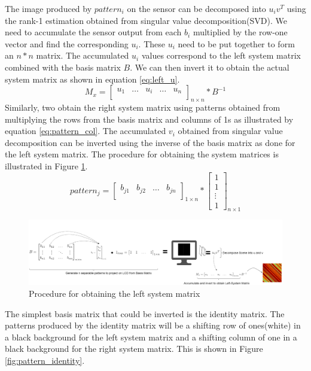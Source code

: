 The image produced by $pattern_i$ on the sensor can be decomposed into $u_iv^T$ using the rank-1 estimation obtained from singular value decomposition(SVD). We need to accumulate the sensor output from each $b_i$ multiplied by the row-one vector and find the corresponding $u_i$. These $u_i$ need to be put together to form an $n*n$ matrix. The accumulated $u_i$ values correspond to the left system matrix combined with the basis matrix $B$. We can then invert it to obtain the actual system matrix as shown in equation \ref{eq:left_u}.
\begin{equation}
M_x = \begin{bmatrix} 
    u_{1} & \dots & u_i &  \dots & u_n \\
  
    \end{bmatrix}_{n\times n} * B^{-1}
    \label{eq:left_u}
\end{equation}
Similarly, two obtain the right system matrix using patterns obtained from multiplying the rows from the basis matrix and columns of 1s as illustrated by equation \ref{eq:pattern_col}. The accumulated $v_i$ obtained from singular value decomposition can be inverted using the inverse of the basis matrix as done for the left system matrix. The procedure for obtaining the system matrices is illustrated in Figure \ref{fig:sys_est}.
\begin{equation}
pattern_{j} = \begin{bmatrix} 
    b_{j1} & b_{j2} & \dots &b_{jn}\\
    \end{bmatrix}_{1\times n} *
    \begin{bmatrix} 
    1\\
    1\\
    \vdots\\
    1
    \end{bmatrix}_{n\times 1}
  \label{eq:pattern_col}
\end{equation}

\begin{figure}[h]
\centering
\includegraphics[width = \linewidth]{pics/system_matrix_estimation.png}
\caption{Procedure for obtaining the left system matrix}
\label{fig:sys_est}
\end{figure}
The simplest basis matrix that could be inverted is the identity matrix. The patterns produced by the identity matrix will be a shifting row of ones(white) in a black background for the left system matrix and a shifting column of one in a black background for the right system matrix. This is shown in Figure \ref{fig:pattern_identity}.

